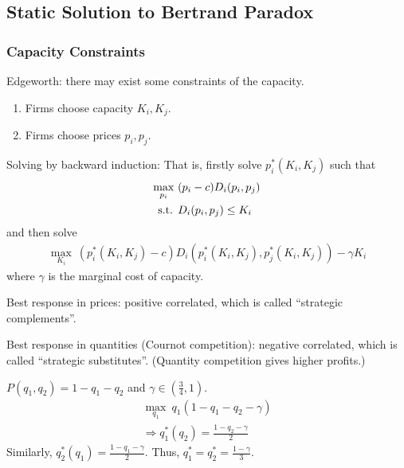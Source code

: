 \documentclass[11pt]{elegantbook}
\begin{document}
\subsection{Static Solution to Bertrand Paradox}
\subsubsection*{Capacity Constraints}
Edgeworth: there may exist some constraints of the capacity.
\begin{enumerate}
    \item Firms choose capacity $K_i,K_j$.
    \item Firms choose prices $p_i,p_j$.
\end{enumerate}
Solving by backward induction: That is, firstly solve $p_i^*(K_i,K_j)$ such that
\begin{equation}
    \begin{aligned}
        \max_{p_i}\ & (p_i-c)D_i(p_i,p_j)\\
        \textnormal{s.t. }&D_i(p_i,p_j)\leq K_i
    \end{aligned}
    \nonumber
\end{equation}
and then solve
\begin{equation}
    \begin{aligned}
        \max_{K_i}\ \left(p_i^*(K_i,K_j)-c\right)D_i(p_i^*(K_i,K_j),p_j^*(K_i,K_j))-\gamma K_i
    \end{aligned}
    \nonumber
\end{equation}
where $\gamma$ is the marginal cost of capacity.

Best response in prices: positive correlated, which is called ``strategic complements''.

Best response in quantities (Cournot competition): negative correlated, which is called ``strategic substitutes''. (Quantity competition gives higher profits.)
\begin{example}
    $P(q_1,q_2)=1-q_1-q_2$ and $\gamma\in (\frac{3}{4},1)$.
    \begin{equation}
        \begin{aligned}
            \max_{q_1}\ q_1\left(1-q_1-q_2-\gamma\right)\\
            \Rightarrow q_1^*(q_2)=\frac{1-q_2-\gamma}{2}
        \end{aligned}
        \nonumber
    \end{equation}
    Similarly, $q_2^*(q_1)=\frac{1-q_1-\gamma}{2}$. Thus, $q_1^*=q_2^*=\frac{1-\gamma}{3}$.
\end{example}
\end{document}
